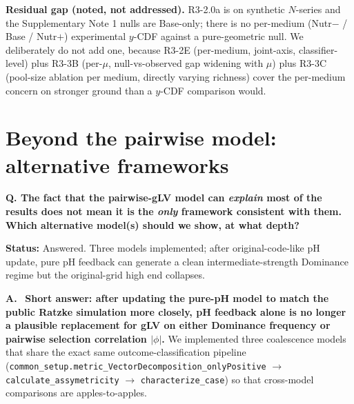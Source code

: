 \documentclass[11pt]{article}
\newcommand{\question}[1]{%
    \par\vspace{0.4em}\noindent%
    {\color{blue!70!black}\textbf{Q. #1}}\par\smallskip%
}
\newcommand{\answerlabel}{\par\noindent\textbf{A.}\ }
\newcommand{\statusmark}[1]{{\color{red!70!black}\textbf{Status:} #1}\par}
\begin{document}
\noindent\textbf{Residual gap (noted, not addressed).} R3-2.0a is on synthetic $N$-series and the Supplementary Note 1 nulls are Base-only; there is no per-medium (Nutr$-$ / Base / Nutr$+$) experimental $y$-CDF against a pure-geometric null. We deliberately do not add one, because R3-2E (per-medium, joint-axis, classifier-level) plus R3-3B (per-$\mu$, null-vs-observed gap widening with $\mu$) plus R3-3C (pool-size ablation per medium, directly varying richness) cover the per-medium concern on stronger ground than a $y$-CDF comparison would.

\section{Beyond the pairwise model: alternative frameworks}
\label{sec:q5_alt_models}

\question{The fact that the pairwise-gLV model can \emph{explain} most of the results does not mean it is the \emph{only} framework consistent with them. Which alternative model(s) should we show, at what depth?}
\statusmark{Answered. Three models implemented; after original-code-like pH update, pure pH feedback can generate a clean intermediate-strength Dominance regime but the original-grid high end collapses.}

\answerlabel
\textbf{Short answer: after updating the pure-pH model to match the public Ratzke simulation more closely, pH feedback alone is no longer a plausible replacement for gLV on either Dominance frequency or pairwise selection correlation $|\phi|$.} We implemented three coalescence models that share the exact same outcome-classification pipeline (\texttt{common\_setup.metric\_VectorDecomposition\_onlyPositive} $\to$ \texttt{calculate\_assymetricity} $\to$ \texttt{characterize\_case}) so that cross-model comparisons are apples-to-apples.
\end{document}
